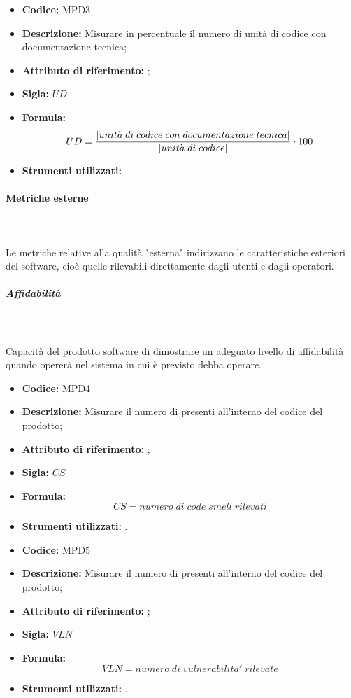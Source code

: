 \begin{itemize}
    \item \textbf{Codice:} MPD3
    \item \textbf{Descrizione:} Misurare in percentuale il numero di unità di codice con documentazione tecnica;
    \item \textbf{Attributo di riferimento:} ;
    \item \textbf{Sigla:} $UD$
    \item \textbf{Formula:} $$UD = {|unit\grave{a} \; di \; codice \; con \; documentazione \; tecnica| \over |unit\grave{a} \; di \; codice|} \cdot 100$$
    \item \textbf{Strumenti utilizzati:}
\end{itemize}
              
       
\paragraph{Metriche esterne}\mbox{}\\ \\
Le metriche relative alla qualità "esterna" indirizzano le caratteristiche esteriori del software, cioè quelle rilevabili direttamente dagli utenti e dagli operatori.

\subparagraph{Affidabilità}\mbox{}\\ \\
Capacità del prodotto software di dimostrare un adeguato livello di affidabilità quando opererà nel sistema in cui è previsto debba operare.
  
\begin{itemize}
    \item \textbf{Codice:} MPD4
    \item \textbf{Descrizione:} Misurare il numero di  presenti all'interno del codice del prodotto;
    \item \textbf{Attributo di riferimento:} ;
    \item \textbf{Sigla:} $CS$
    \item \textbf{Formula:} $$CS = {numero \; di \; code \; smell \; rilevati}$$
    \item \textbf{Strumenti utilizzati:} .
\end{itemize}

\begin{itemize}
    \item \textbf{Codice:} MPD5
    \item \textbf{Descrizione:} Misurare il numero di  presenti all'interno del codice del prodotto;
    \item \textbf{Attributo di riferimento:} ;
    \item \textbf{Sigla:} $VLN$
    \item \textbf{Formula:} $$VLN = {numero \; di \; vulnerabilita' \; rilevate}$$
    \item \textbf{Strumenti utilizzati:} .
\end{itemize}

